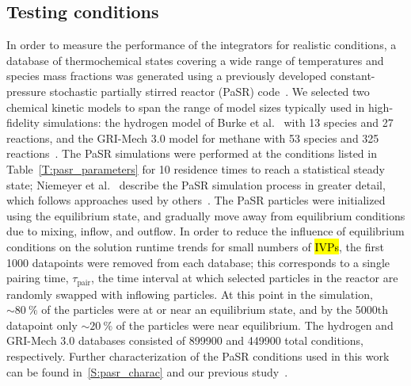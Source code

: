 \documentclass[preprint,review,11pt]{elsarticle}
\DeclareRobustCommand{\hlg}[1]{\sethlcolor{green}\hl{#1}}
\begin{document}
\subsection{Testing conditions}
\label{S:pasr_conditions}

In order to measure the performance of the integrators for realistic conditions, a database of thermochemical states covering a wide range of temperatures and species mass fractions was generated using a previously developed constant-pressure stochastic partially stirred reactor (PaSR) code~\cite{Niemeyer:2016aa,niemeyer_2016_51139}.
We selected two chemical kinetic models to span the range of model sizes typically used in high-fidelity simulations: the hydrogen model of Burke et al.~\cite{Burke:2011fh} with 13 species and 27 reactions, and the GRI-Mech 3.0 model for methane with 53 species and 325 reactions~\cite{smith_gri-mech_30}.
The PaSR simulations were performed at the conditions listed in Table~\ref{T:pasr_parameters} for 10 residence times to reach a statistical steady state; Niemeyer et al.~\cite{Niemeyer:2016aa} describe the PaSR simulation process in greater detail, which follows approaches used by others~\cite{Chen:1997ta,Pope:1997wu,Ren:2014cd}.
The PaSR particles were initialized using the equilibrium state, and gradually move away from equilibrium conditions due to mixing, inflow, and outflow.
In order to reduce the influence of equilibrium conditions on the solution runtime trends for small numbers of \hlg{IVPs}, the first \num{1000} datapoints were removed from each database; this corresponds to a single pairing time, $\tau_\text{pair}$, the time interval at which selected particles in the reactor are randomly swapped with inflowing particles.
At this point in the simulation, $\sim\SI{80}{\percent}$ of the particles were at or near an equilibrium state, and by the \num{5000}th datapoint only $\sim\SI{20}{\percent}$ of the particles were near equilibrium.
The hydrogen and GRI-Mech 3.0 databases consisted of \num{899900} and \num{449900} total conditions, respectively.
Further characterization of the PaSR conditions used in this work can be found in~\ref{S:pasr_charac} and our previous study~\cite{Niemeyer:2016aa}.
\end{document}
